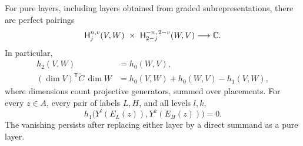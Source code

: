 \begin{lemma}
\label{null:hom}
For pure layers, including layers obtained from graded
subrepresentations, there are perfect pairings
\begin{equation}
 \mathsf H_j^{n,v}(V,W)\ \times\
 \mathsf H_{2-j}^{-n,\,2-v}(W,V)\longrightarrow\kk.
 \label{null:pairing}
\end{equation}
In particular,
\begin{equation}
 \begin{split}
 h_2(V,W)&=h_0(W,V),\\
 (\dim V)^{\mathsf T}\widetilde C\,\dim W
   &=h_0(V,W)+h_0(W,V)-h_1(V,W),
 \end{split}
 \label{null:euler}
\end{equation}
where dimensions count projective generators, summed over placements.
For every $z\in A$, every pair of labels $L,H$, and all levels $l,k$,
\begin{equation}
 h_1\bigl(Y^l(E_L(z)),Y^k(E_H(z))\bigr)=0.
 \label{null:middle}
\end{equation}
The vanishing persists after replacing either layer by a direct
summand as a pure layer.
\end{lemma}

